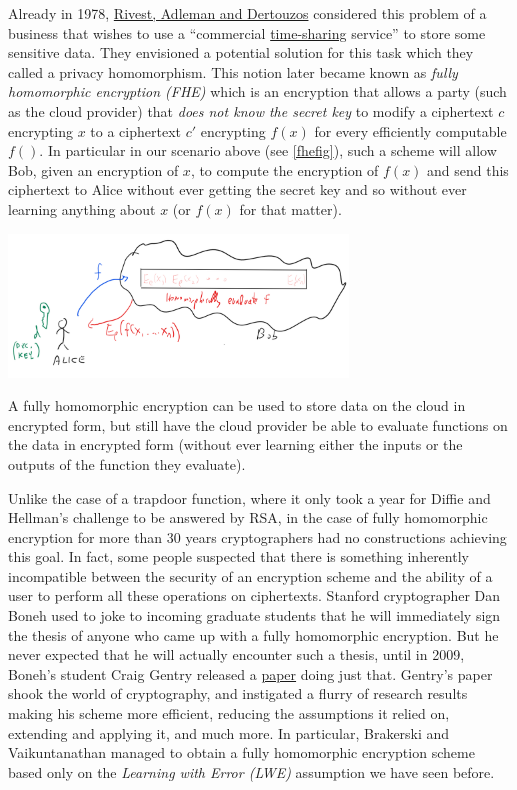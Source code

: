 Already in 1978,
\href{http://luca-giuzzi.unibs.it/corsi/Support/papers-cryptography/RAD78.pdf}{Rivest,
Adleman and Dertouzos} considered this problem of a business that wishes
to use a ``commercial
\href{https://en.wikipedia.org/wiki/Time-sharing}{time-sharing}
service'' to store some sensitive data. They envisioned a potential
solution for this task which they called a privacy homomorphism. This
notion later became known as \emph{fully homomorphic encryption (FHE)}
which is an encryption that allows a party (such as the cloud provider)
that \emph{does not know the secret key} to modify a ciphertext \(c\)
encrypting \(x\) to a ciphertext \(c'\) encrypting \(f(x)\) for every
efficiently computable \(f()\). In particular in our scenario above (see
\cref{fhefig}), such a scheme will allow Bob, given an encryption of
\(x\), to compute the encryption of \(f(x)\) and send this ciphertext to
Alice without ever getting the secret key and so without ever learning
anything about \(x\) (or \(f(x)\) for that matter).


\begin{marginfigure}
\centering
\includegraphics[width=\linewidth, height=1.5in, keepaspectratio]{../figure/fhedescription.png}
\caption{A fully homomorphic encryption can be used to store data on the
cloud in encrypted form, but still have the cloud provider be able to
evaluate functions on the data in encrypted form (without ever learning
either the inputs or the outputs of the function they evaluate).}
\label{fhefig}
\end{marginfigure}

Unlike the case of a trapdoor function, where it only took a year for
Diffie and Hellman's challenge to be answered by RSA, in the case of
fully homomorphic encryption for more than 30 years cryptographers had
no constructions achieving this goal. In fact, some people suspected
that there is something inherently incompatible between the security of
an encryption scheme and the ability of a user to perform all these
operations on ciphertexts. Stanford cryptographer Dan Boneh used to joke
to incoming graduate students that he will immediately sign the thesis
of anyone who came up with a fully homomorphic encryption. But he never
expected that he will actually encounter such a thesis, until in 2009,
Boneh's student Craig Gentry released a
\href{https://crypto.stanford.edu/craig/}{paper} doing just that.
Gentry's paper shook the world of cryptography, and instigated a flurry
of research results making his scheme more efficient, reducing the
assumptions it relied on, extending and applying it, and much more. In
particular, Brakerski and Vaikuntanathan managed to obtain a fully
homomorphic encryption scheme based only on the \emph{Learning with
Error (LWE)} assumption we have seen before.

